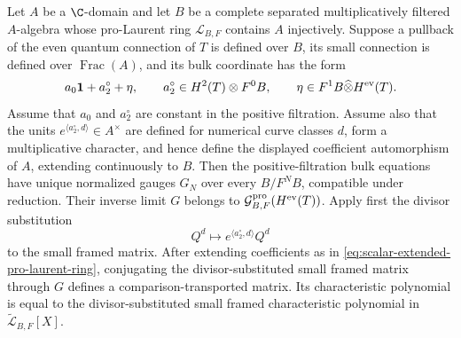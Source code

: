 \begin{lemma}
\label{lem:formal-base-shift}
Let \(A\) be a \(\C\)-domain and let \(B\) be a complete separated
multiplicatively filtered \(A\)-algebra whose pro-Laurent ring
\(\mathscr L_{B,F}\) contains \(A\) injectively.  Suppose a pullback of the even
quantum connection of \(T\) is defined over \(B\), its small connection is
defined over \(\operatorname{Frac}(A)\), and its bulk coordinate has the form
\[
 a_0\mathbf1+a_2^\circ+\eta,
 \qquad a_2^\circ\in H^2(T)\otimes F^0B,
 \qquad \eta\in F^1B\widehat\otimes H^{\rm ev}(T).
\]
Assume that \(a_0\) and \(a_2^\circ\) are constant in the positive filtration.
Assume also that the units
\(e^{\langle a_2^\circ,d\rangle}\in A^\times\) are defined for numerical
curve classes \(d\), form a multiplicative character, and hence define the
displayed coefficient automorphism of \(A\), extending continuously to
\(B\).
Then the positive-filtration bulk equations have unique normalized gauges
\(G_N\) over every \(B/F^NB\), compatible under reduction.  Their inverse
limit \(G\) belongs to
\(\mathcal G^{\rm pro}_{B,F}(H^{\rm ev}(T))\).  Apply first the divisor
substitution
\[
 Q^d\longmapsto e^{\langle a_2^\circ,d\rangle}Q^d
 \tag{4.1}
 \label{eq:formal-base-shift-divisor}
\]
to the small framed matrix.  After extending coefficients as in
\eqref{eq:scalar-extended-pro-laurent-ring}, conjugating the
divisor-substituted small framed matrix through \(G\) defines a
comparison-transported matrix.  Its characteristic
polynomial is equal to the divisor-substituted small framed characteristic
polynomial in \(\widetilde{\mathscr L}_{B,F}[X]\).
\end{lemma}

